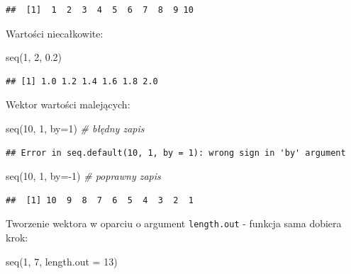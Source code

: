 \documentclass[
]{book}
\newenvironment{Shaded}{\begin{snugshade}}{\end{snugshade}}
\newcommand{\AttributeTok}[1]{\textcolor[rgb]{0.77,0.63,0.00}{#1}}
\newcommand{\CommentTok}[1]{\textcolor[rgb]{0.56,0.35,0.01}{\textit{#1}}}
\newcommand{\DecValTok}[1]{\textcolor[rgb]{0.00,0.00,0.81}{#1}}
\newcommand{\FloatTok}[1]{\textcolor[rgb]{0.00,0.00,0.81}{#1}}
\newcommand{\FunctionTok}[1]{\textcolor[rgb]{0.00,0.00,0.00}{#1}}
\newcommand{\NormalTok}[1]{#1}
\newcommand{\SpecialCharTok}[1]{\textcolor[rgb]{0.00,0.00,0.00}{#1}}
\begin{document}
\begin{verbatim}
##  [1]  1  2  3  4  5  6  7  8  9 10
\end{verbatim}

Wartości niecałkowite:

\begin{Shaded}
\begin{Highlighting}[]
\FunctionTok{seq}\NormalTok{(}\DecValTok{1}\NormalTok{, }\DecValTok{2}\NormalTok{, }\FloatTok{0.2}\NormalTok{)}
\end{Highlighting}
\end{Shaded}

\begin{verbatim}
## [1] 1.0 1.2 1.4 1.6 1.8 2.0
\end{verbatim}

Wektor wartości malejących:

\begin{Shaded}
\begin{Highlighting}[]
\FunctionTok{seq}\NormalTok{(}\DecValTok{10}\NormalTok{, }\DecValTok{1}\NormalTok{, }\AttributeTok{by=}\DecValTok{1}\NormalTok{) }\CommentTok{\# błędny zapis}
\end{Highlighting}
\end{Shaded}

\begin{verbatim}
## Error in seq.default(10, 1, by = 1): wrong sign in 'by' argument
\end{verbatim}

\begin{Shaded}
\begin{Highlighting}[]
\FunctionTok{seq}\NormalTok{(}\DecValTok{10}\NormalTok{, }\DecValTok{1}\NormalTok{, }\AttributeTok{by=}\SpecialCharTok{{-}}\DecValTok{1}\NormalTok{) }\CommentTok{\# poprawny zapis}
\end{Highlighting}
\end{Shaded}

\begin{verbatim}
##  [1] 10  9  8  7  6  5  4  3  2  1
\end{verbatim}

Tworzenie wektora w oparciu o argument \texttt{length.out} - funkcja sama dobiera krok:

\begin{Shaded}
\begin{Highlighting}[]
\FunctionTok{seq}\NormalTok{(}\DecValTok{1}\NormalTok{, }\DecValTok{7}\NormalTok{, }\AttributeTok{length.out =} \DecValTok{13}\NormalTok{)}
\end{Highlighting}
\end{Shaded}
\end{document}
